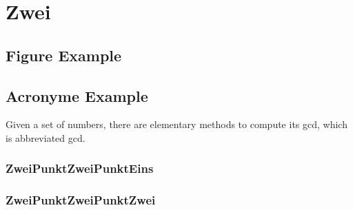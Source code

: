 
\section{Zwei}

\newpage

\subsection{Figure Example}


\newpage

\subsection{Acronyme Example}

Given a set of numbers, there are elementary methods to compute its \acrlong{gcd}, which is abbreviated \acrshort{gcd}. \parencite[s.][]{2020_latex}

\newpage

\subsubsection{ZweiPunktZweiPunktEins}

\newpage

\subsubsection{ZweiPunktZweiPunktZwei}

\newpage
